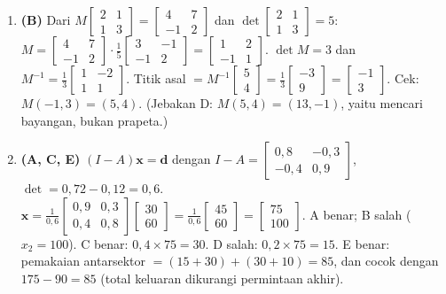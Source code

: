 \documentclass[a4paper,11pt]{article}
\begin{document}
\begin{enumerate}[leftmargin=2em,itemsep=2pt,topsep=2pt]
\item[\textbf{13.}] \textbf{(B)} Dari $M\begin{bmatrix}2&1\\1&3\end{bmatrix}=\begin{bmatrix}4&7\\-1&2\end{bmatrix}$ dan $\det\begin{bmatrix}2&1\\1&3\end{bmatrix}=5$: $M=\begin{bmatrix}4&7\\-1&2\end{bmatrix}\cdot\frac15\begin{bmatrix}3&-1\\-1&2\end{bmatrix}=\begin{bmatrix}1&2\\-1&1\end{bmatrix}$. $\det M=3$ dan $M^{-1}=\frac13\begin{bmatrix}1&-2\\1&1\end{bmatrix}$. Titik asal $=M^{-1}\begin{bmatrix}5\\4\end{bmatrix}=\frac13\begin{bmatrix}-3\\9\end{bmatrix}=\begin{bmatrix}-1\\3\end{bmatrix}$. Cek: $M(-1,3)=(5,4)$. (Jebakan D: $M(5,4)=(13,-1)$, yaitu mencari bayangan, bukan prapeta.)
\item[\textbf{14.}] \textbf{(A, C, E)} $(I-A)\mathbf{x}=\mathbf{d}$ dengan $I-A=\begin{bmatrix}0{,}8&-0{,}3\\-0{,}4&0{,}9\end{bmatrix}$, $\det=0{,}72-0{,}12=0{,}6$. $\mathbf{x}=\frac{1}{0{,}6}\begin{bmatrix}0{,}9&0{,}3\\0{,}4&0{,}8\end{bmatrix}\begin{bmatrix}30\\60\end{bmatrix}=\frac{1}{0{,}6}\begin{bmatrix}45\\60\end{bmatrix}=\begin{bmatrix}75\\100\end{bmatrix}$. A benar; B salah ($x_2=100$). C benar: $0{,}4\times75=30$. D salah: $0{,}2\times75=15$. E benar: pemakaian antarsektor $=(15+30)+(30+10)=85$, dan cocok dengan $175-90=85$ (total keluaran dikurangi permintaan akhir).

\end{enumerate}
\end{document}
